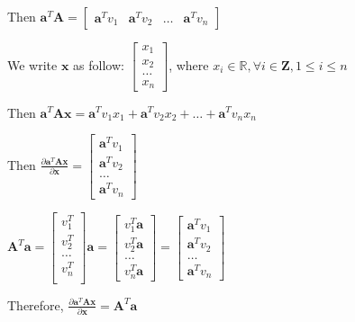 \documentclass[12pt]{article}
\newcommand{\Rbb}{\mathbb{R}}
\newcommand{\Z}{\mathbf{Z}}
\begin{document}
\begin{enumerate}
\begin{enumerate}
            Then $\pmb{a}^T\pmb{A} = 
            \begin{bmatrix}
                \pmb{a}^Tv_1 & \pmb{a}^Tv_2 & \dots &\pmb{a}^Tv_n
            \end{bmatrix}$

            We write $\pmb{x}$ as follow:
            $\begin{bmatrix}
                x_1 \\
                x_2 \\
                \dots \\
                x_n
            \end{bmatrix}$, where $x_i \in \Rbb, \forall i \in \Z, 1\le i \le n$

            Then $\pmb{a}^T\pmb{Ax} = 
                \pmb{a}^Tv_1x_1 + \pmb{a}^Tv_2x_2 + \dots + \pmb{a}^Tv_nx_n$

            Then $\frac{\partial \pmb{a}^T\pmb{Ax}}{\partial \pmb{x}} = 
            \begin{bmatrix}
                \pmb{a}^Tv_1 \\ \pmb{a}^Tv_2 \\ \dots \\ \pmb{a}^Tv_n
            \end{bmatrix}$

            $\pmb{A}^T\pmb{a} = \begin{bmatrix}
                v_1^T \\
                v_2^T \\
                \dots \\
                v_n^T \\
            \end{bmatrix} \pmb{a} =
            \begin{bmatrix}
                v_1^T\pmb{a} \\
                v_2^T\pmb{a} \\
                \dots \\
                v_n^T\pmb{a}
            \end{bmatrix} = 
            \begin{bmatrix}
                \pmb{a}^Tv_1 \\ \pmb{a}^Tv_2 \\ \dots \\ \pmb{a}^Tv_n
            \end{bmatrix}
            $

            Therefore, $\frac{\partial \pmb{a}^T\pmb{Ax}}{\partial \pmb{x}} = \pmb{A}^T\pmb{a}$
            

\end{enumerate}
\end{enumerate}
\end{document}
